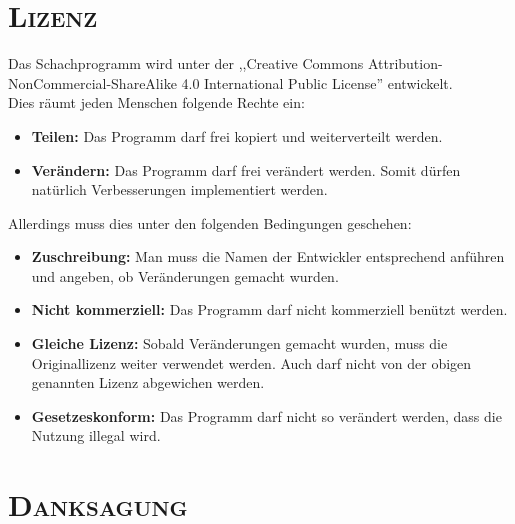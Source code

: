 \documentclass[12pt,a4paper]{article}
\begin{document}
\clearpage\vfill\newpage{}
\renewcommand\thesection{ii}
\section{\scshape Lizenz}
\label{SEC:licence}

Das Schachprogramm wird unter der ,,Creative Commons Attribution-NonCommercial-ShareAlike 4.0 International Public License'' entwickelt. \\
Dies räumt jeden Menschen folgende Rechte ein: 
\begin{itemize}
	\item{\textbf{Teilen:} Das Programm darf frei kopiert und weiterverteilt werden.}
	\item{\textbf{Verändern:} Das Programm darf frei verändert werden. Somit dürfen natürlich Verbesserungen implementiert werden.}
\end{itemize}

Allerdings muss dies unter den folgenden Bedingungen geschehen:
\begin{itemize}
	\item{\textbf{Zuschreibung:} Man muss die Namen der Entwickler entsprechend anführen und angeben, ob Veränderungen gemacht wurden.}
	\item{\textbf{Nicht kommerziell:} Das Programm darf nicht kommerziell benützt werden.}
	\item{\textbf{Gleiche Lizenz:} Sobald Veränderungen gemacht wurden, muss die Originallizenz weiter verwendet werden. Auch darf nicht von der obigen genannten Lizenz abgewichen werden.}
	\item{\textbf{Gesetzeskonform:} Das Programm darf nicht so verändert werden, dass die Nutzung illegal wird.}
\end{itemize}

\newpage
\renewcommand\thesection{iii}
\section{\scshape Danksagung}
\label{SEC:THANKS}
\end{document}
